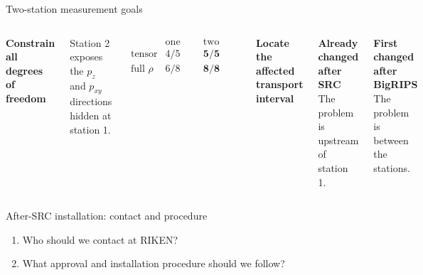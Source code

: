 \documentclass[aspectratio=169,11pt]{beamer}
\begin{document}
\begin{frame}{Two-station measurement goals}
  \vspace{0.65em}
  \begin{columns}[T,onlytextwidth]
      \textbf{Constrain all degrees of freedom}

      \vspace{0.55em}
      Station 2 exposes the $p_z$ and $p_{xy}$ directions hidden at station 1.

      \vspace{0.80em}
      \[
        \begin{array}{c|cc}
          & \text{one station} & \text{two stations} \\
          \hline
          \text{tensor} & 4/5 & \mathbf{5/5} \\
          \text{full }\rho & 6/8 & \mathbf{8/8}
        \end{array}
      \]

      \textbf{Locate the affected transport interval}

      \vspace{0.65em}
      {\color{Teal}\bfseries Already changed after SRC}\\[0.20em]
      The problem is upstream of station 1.

      \vspace{1.10em}
      {\color{Teal}\bfseries First changed after BigRIPS}\\[0.20em]
      The problem is between the stations.
  \end{columns}

\end{frame}

\begin{frame}{After-SRC installation: contact and procedure}
  \vspace{0.85em}
  \begin{enumerate}
    \setlength\itemsep{1.30em}
    \item {\Large Who should we contact at RIKEN?}
    \item {\Large What approval and installation procedure should we follow?}
  \end{enumerate}
\end{frame}
\end{document}
